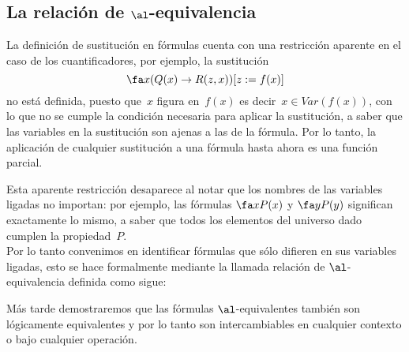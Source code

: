 \documentclass[11pt,letterpaper]{article}
\begin{document}
\subsection{La relación de $\al$-equivalencia}

La definición de sustitución en fórmulas cuenta con una restricción aparente
en el caso de los cuantificadores, por ejemplo, la sustitución
\[
\fa x (Q(x)\to R(z,x))[z:=f(x)]
\] 
no está definida, puesto que~$x$ figura en~$f(x)$ es decir~$x\in Var(f(x))$, 
con lo que no se cumple la condición necesaria para aplicar la sustitución, a 
saber que las variables en la sustitución son ajenas a las de la fórmula.
Por lo tanto, la aplicación de cualquier sustitución a una fórmula hasta 
ahora es una función parcial.

\vspace*{10pt}

Esta aparente restricción desaparece al notar que los nombres de las 
variables ligadas no importan: por ejemplo, las fórmulas $\fa x P(x)$ y 
$\fa y P(y)$ significan exactamente lo mismo, a saber que todos los 
elementos del universo dado cumplen la propiedad~$P$.\\

Por lo tanto convenimos en identificar fórmulas que sólo difieren en sus
variables ligadas, esto se hace formalmente mediante la llamada relación de
$\al$-equivalencia definida como sigue:



Más tarde demostraremos que las fórmulas $\al$-equivalentes también son 
lógicamente equivalentes y por lo tanto son intercambiables en cualquier 
contexto o bajo cualquier operación.

\vspace*{10pt}
\end{document}
